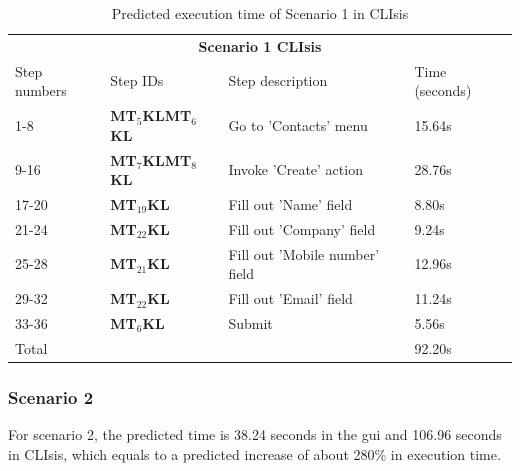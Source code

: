 \begin{table}[H]
	\center
	
	\begin{tabular}{llll}
		\toprule
		\multicolumn{4}{c}{\textbf{Scenario 1 CLIsis}} \\
		\addlinespace[0.5em]
		Step numbers & Step IDs & Step description & Time (seconds) \\
		\midrule
		1-8 		& \textbf{MT$_5$KLMT$_6$KL}	& Go to 'Contacts' menu 			& 15.64s \\
		9-16		& \textbf{MT$_7$KLMT$_8$KL}	& Invoke 'Create' action			& 28.76s \\
		17-20	& \textbf{MT$_{19}$KL}				& Fill out 'Name' field				& 8.80s \\
		21-24	& \textbf{MT$_{22}$KL}				& Fill out 'Company' field			& 9.24s \\
		25-28	& \textbf{MT$_{21}$KL}				& Fill out 'Mobile number' field	& 12.96s \\
		29-32	& \textbf{MT$_{22}$KL}				& Fill out 'Email' field				& 11.24s \\
		33-36	& \textbf{MT$_6$KL}						& Submit									& 5.56s \\
		\midrule
		\multicolumn{3}{l}{Total}																			& 92.20s\\
		\bottomrule
	\end{tabular}
	
	\caption{Predicted execution time of Scenario 1 in CLIsis}
	\label{table:gomsscenario1clisis}
\end{table}

\subsubsection{Scenario 2}
For scenario 2, the predicted time is 38.24 seconds in the \acrshort{gui} and 106.96 seconds in CLIsis, which equals to a predicted increase of about 280\% in execution time.

